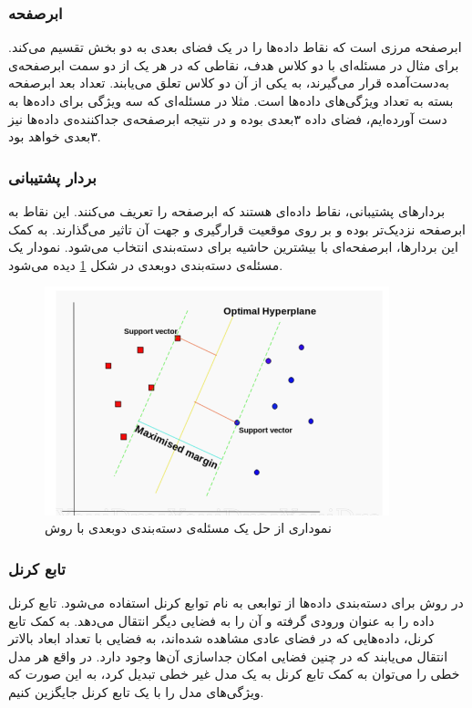 \subsubsection{ابرصفحه}
ابرصفحه مرزی است که نقاط داده‌ها را در یک فضای بعدی به دو بخش تقسیم می‌کند. برای مثال در مسئله‌ای با دو کلاس هدف، نقاطی که در هر یک از دو سمت ابرصفحه‌ی به‌دست‌آمده قرار می‌گیرند، به یکی از آن دو کلاس تعلق می‌یابند. تعداد بعد ابرصفحه بسته به تعداد ویژگی‌های داده‌ها است. مثلا در مسئله‌ای که سه ویژگی برای داده‌ها به دست آورده‌ایم، فضای داده ۳بعدی بوده و در نتیجه ابرصفحه‌ی جداکننده‌ی داده‌ها نیز ۳بعدی خواهد بود.

\subsubsection{بردار پشتیبانی}
بردارهای پشتیبانی، نقاط داده‌ای هستند که ابرصفحه را تعریف می‌کنند. این نقاط به ابرصفحه نزدیک‌تر بوده و بر روی موقعیت قرارگیری و جهت آن تاثیر می‌گذارند. به کمک این بردارها، ابرصفحه‌ای با بیشترین حاشیه برای دسته‌بندی انتخاب می‌شود.\cite{SVM} نمودار یک مسئله‌ی دسته‌بندی دوبعدی در شکل \ref{fig:SVMClassification} دیده می‌شود.

\begin{figure}
\centering
\includegraphics[width=10cm]{Figures/svmMargin.png}
\caption{ نموداری از حل یک مسئله‌ی دسته‌بندی دوبعدی با روش \cite{SVM}}
\label{fig:SVMClassification}
\end{figure}
 

\subsubsection{ تابع کرنل}
در روش  برای دسته‌بندی داده‌ها از توابعی به نام توابع کرنل استفاده می‌شود. تابع کرنل داده را به عنوان ورودی گرفته و آن را به فضایی دیگر انتقال  می‌دهد. به کمک تابع کرنل، داده‌هایی که در فضای عادی مشاهده شده‌اند، به فضایی با تعداد ابعاد بالاتر انتقال می‌یابند که در چنین فضایی امکان جداسازی آن‌ها وجود دارد. در واقع هر مدل خطی را می‌توان به کمک تابع کرنل به یک مدل غیر خطی تبدیل کرد، به این صورت که ویژگی‌های مدل را با یک تابع کرنل جایگزین کنیم. 

